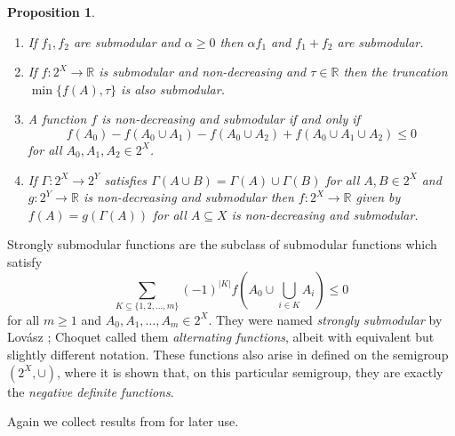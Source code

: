 \documentclass{article}
\theoremstyle{plain}
\newtheorem{proposition}[theorem]{Proposition}
\theoremstyle{definition}
\renewcommand{\Re}{\mathbb{R}}
\begin{document}
\begin{proposition} \label{prop:basic_submodular}
\begin{enumerate}
\item If $f_1,f_2$ are submodular and $\alpha \geq 0$ then $\alpha f_1$ and $f_1 + f_2$ are submodular. 
\item If $f:2^X \rightarrow \Re$ is submodular and non-decreasing and $\tau \in \Re$ then the truncation $\min\{f(A),\tau\}$ is also submodular. %
\item A function $f$ is non-decreasing and submodular  if and only if
\begin{equation}
f(A_0) - f(A_0 \cup A_1) - f(A_0 \cup A_2) + f(A_0 \cup A_1 \cup A_2) \leq 0 \label{eq:submod2}
\end{equation}
for all $A_0,A_1,A_2 \in 2^X$. %
\item If $\Gamma:2^X \rightarrow 2^Y$ satisfies $\Gamma(A \cup B) = \Gamma(A) \cup \Gamma(B)$ for all $A,B \in 2^X$ and $g:2^Y \rightarrow \Re$ is non-decreasing and submodular then $f:2^X \rightarrow \Re$ given by $f(A) = g(\Gamma(A))$ for all $A \subseteq X$ is non-decreasing and submodular.  %
\end{enumerate}
\end{proposition}

Strongly submodular functions are the subclass of submodular functions which satisfy 
\begin{equation}
\sum_{K \subseteq \{1,2,\ldots,m\}} (-1)^{|K|} f\left(A_0 \cup \bigcup_{i \in K} A_i \right) \leq 0
\end{equation}
for all $m \geq 1$ and $A_0,A_1,\ldots,A_m \in 2^X$. They were named {\em strongly submodular} by Lov\'asz \cite{lovasz-2023-submodular-setfunctions}; Choquet \cite[Chap.~3]{choquet-1954-capacities} called them {\em alternating functions}, albeit with equivalent but slightly different notation. These functions also arise in \cite{BergChristensenRessel1984} defined on the semigroup $(2^X,\cup)$, where it is shown that, on this particular semigroup, they are exactly the {\em negative definite functions}. 

Again we collect results from \cite{lovasz-2023-submodular-setfunctions} for later use. 
\end{document}
